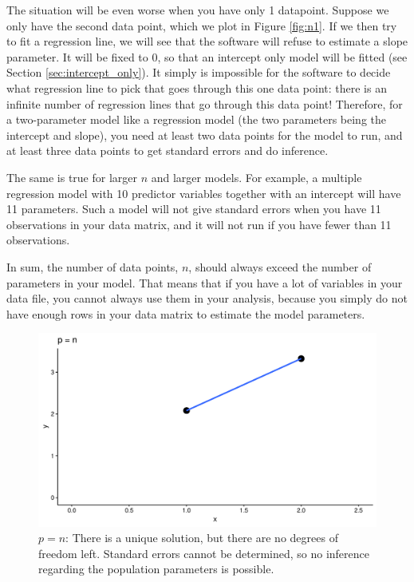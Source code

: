 \documentclass[]{book}\usepackage[]{graphicx}\usepackage[]{color}
\makeatletter
\def\maxwidth{ %
  \ifdim\Gin@nat@width>\linewidth
    \linewidth
  \else
    \Gin@nat@width
  \fi
}
\newenvironment{knitrout}{}{} %
\makeatother
\begin{document}
The situation will be even worse when you have only 1 datapoint. Suppose we only have the second data point, which we plot in Figure \ref{fig:n1}. If we then try to fit a regression line, we will see that the software will refuse to estimate a slope parameter. It will be fixed to 0, so that an intercept only model will be fitted (see Section \ref{sec:intercept_only}). It simply is impossible for the software to decide what regression line to pick that goes through this one data point: there is an infinite number of  regression lines that go through this data point! Therefore, for a two-parameter model like a regression model (the two parameters being the intercept and slope), you need at least two data points for the model to run, and at least three data points to get standard errors and do inference. 

The same is true for larger $n$ and larger models. For example, a multiple regression model with 10 predictor variables together with an intercept will have 11 parameters. Such a model will not give standard errors when you have 11 observations in your data matrix, and it will not run if you have fewer than 11 observations.


In sum, the number of data points, $n$, should always exceed the number of parameters in your model. That means that if you have a lot of variables in your data file, you cannot always use them in your analysis, because you simply do not have enough rows in your data matrix to estimate the model parameters.  



\begin{knitrout}
\color{fgcolor}\begin{figure}
\includegraphics[width=\maxwidth]{figure/n2-1} \caption[$p = n$]{$p = n$: There is a unique solution, but there are no degrees of freedom left. Standard errors cannot be determined, so no inference regarding the population parameters is possible.}\label{fig:n2}
\end{figure}


\end{knitrout}
\end{document}

